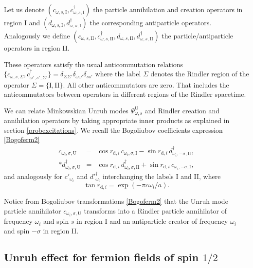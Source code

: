 Let us denote $(c_{\omega,s,\text{I}},c^{\dagger}_{\omega,s,\text{I}})$ the particle annihilation and creation operators in region I and $(d_{\omega,s,\text{I}},d^{\dagger}_{\omega,s,\text{I}})$ the corresponding antiparticle operators. Analogously we define $(c_{\omega,s,\text{II}},c^{\dagger}_{\omega,s,\text{II}}, d_{\omega,s,\text{II}},d_{\omega,s,\text{II}}^\dagger)$ the particle/antiparticle operators in region II.

These operators satisfy the usual anticommutation relations $\{c_{\omega,s,\Sigma},c^\dagger_{\omega',s',\Sigma'}\}=\delta_{\Sigma\Sigma'}\delta_{\omega\omega'}\delta_{ss'}$ where the label $\Sigma$ denotes the Rindler region of the operator $\Sigma=\{\text{I},\text{II}\}$. All other anticommutators are zero. That includes the anticommutators between operators in different regions of the Rindler spacetime.

We can relate Minkowskian Unruh modes $\Psi^\text{U}_{\omega,s}$ and Rindler creation and annihilation operators by taking appropriate inner products \cite{Takagi,Jauregui,Birrell,AlsingSchul} as explained in section \ref{probexcitations}. We recall the Bogoliubov coefficients expression \eqref{Bogoferm2}
\begin{eqnarray}\label{Bogoferm3}
\nonumber c_{{\omega_i},\sigma,\text{U}}&=&\cos{r_{\text{d},i}}\,c_{{\omega_i},
\sigma,\text{I}}-\sin r_{\text{d},i}\,d^\dagger_{{\omega_i},-\sigma,\text{II}},\\*
d_{{\omega_i},\sigma,\text{U}}^\dagger&=&\cos{r_{\text{d},i}}\,d^\dagger_{
{\omega_i},\sigma,\text{II}}+\sin r_{\text{d},i}\,c_{{\omega_i},-\sigma,\text{I}},
\end{eqnarray}
and analogously for $c'_{\omega_i}$ and $d'^\dagger_{\omega_i}$ interchanging the labels I and II, where
\begin{equation}\label{defr}
\tan r_{\text{d},i}=\exp(-\pi {c{\omega_i}}/{a}).
\end{equation}

Notice from Bogoliubov transformations \eqref{Bogoferm2} that the Unruh mode particle annihilator $c_{\omega_i,\sigma,\text{U}}$ transforms into a Rindler particle annihilator of frequency $\omega_i$ and spin $s$ in region I and an antiparticle creator of frequency $\omega_i$ and spin $-\sigma$ in region II.


\subsection{Unruh effect for fermion fields of spin $1/2$}\label{sec42m}

